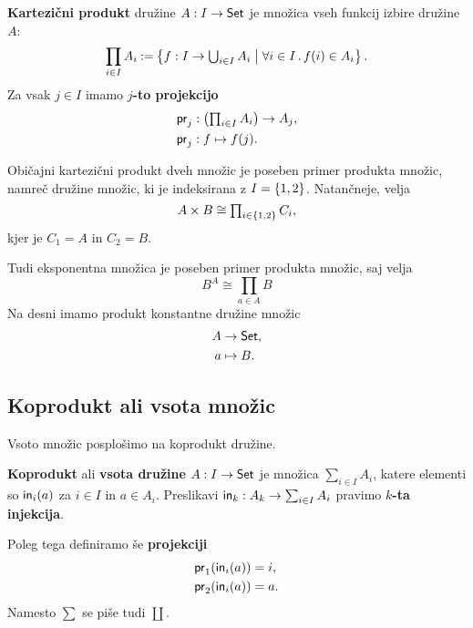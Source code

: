  \begin{definicija}
   \textbf{Kartezični produkt} družine $A : I \to \Set$ je množica vseh funkcij izbire družine~$A$:
   \begin{equation*}
     \prod_{i \in I} A_i \defeq
     \set{f : I \to \textstyle\bigcup_{i \in I} A_i \such \all{i \in I} f(i) \in A_i}.
   \end{equation*}
   Za vsak $j \in I$ imamo \textbf{$j$-to projekcijo}
   \begin{align*}
    \pr[j] &:  \left(\textstyle\prod_{i \in I} A_i\right) \to A_j, \\
    \pr[j] &:  f \mapsto f(j).
   \end{align*}
 \end{definicija}

Običajni kartezični produkt dveh množic je poseben primer produkta množic, namreč družine
množic, ki je indeksirana z $I = \set{1, 2}$. Natančneje, velja
%
\begin{equation*}
  A \times B \cong \textstyle\prod_{i \in \set{1, 2}} C_i,
\end{equation*}
%
kjer je $C_1 = A$ in $C_2 = B$.

Tudi eksponentna množica je poseben primer produkta množic, saj velja
%
\begin{equation*}
  B^A \cong \textstyle\prod_{a \in A} B
\end{equation*}
%
Na desni imamo produkt konstantne družine množic
\begin{align*}
  A &\to \Set, \\
  a &\mapsto B.
\end{align*}


\subsection{Koprodukt ali vsota množic}

Vsoto množic posplošimo na koprodukt družine.

\begin{definicija}
  \textbf{Koprodukt} ali \textbf{vsota družine} $A : I \to \Set$ je množica
  $\sum_{i \in I} A_i$, katere elementi so $\inj[i](a)$ za $i \in I$ in $a \in A_i$.
  Preslikavi $\inj[k] : A_k \to \sum_{i \in I} A_i$ pravimo \textbf{$k$-ta injekcija}.

  Poleg tega definiramo še \textbf{projekciji}
  \begin{align*}
    \fst (\inj[i](a)) &= i, \\
    \snd (\inj[i](a)) &= a.
  \end{align*}
  Namesto $\sum$ se piše tudi $\coprod$.
\end{definicija}

